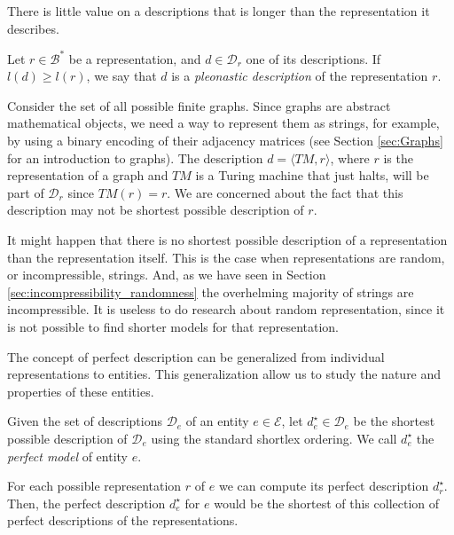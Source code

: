 There is little value on a descriptions that is longer than the representation it describes.

\begin{definition}
\label{def:trivial_model}
Let $r \in \mathcal{B}^\ast$ be a representation, and $d \in \mathcal{D}_r$ one of its descriptions. If $l(d) \geq l(r)$, we say that $d$ is a \emph{pleonastic description} of the representation $r$.
\end{definition}

\begin{example}
\label{ex:topics_models_graph}
Consider the set of all possible finite graphs. Since graphs are abstract mathematical objects, we need a way to represent them as strings, for example, by using a binary encoding of their adjacency matrices (see Section \ref{sec:Graphs} for an introduction to graphs). The description $d = \langle TM, r \rangle$, where $r$ is the representation of a graph and $TM$ is a Turing machine that just halts, will be part of $\mathcal{D}_r$ since $TM(r) = r$. We are concerned about the fact that this description may not be shortest possible description of $r$.
\end{example}

It might happen that there is no shortest possible description of a representation than the representation itself. This is the case when representations are random, or incompressible, strings. And, as we have seen in Section \ref{sec:incompressibility_randomness} the overhelming majority of strings are incompressible. It is useless to do research about random representation, since it is not possible to find shorter models for that representation.

The concept of perfect description can be generalized from individual representations to entities. This generalization allow us to study the nature and properties of these entities.

\begin{definition}
\label{def:entities_perfect_model}
Given the set of descriptions $\mathcal{D}_e$ of an entity $e \in \mathcal{E}$, let $d_e^{\star} \in \mathcal{D}_e$ be the shortest possible description of $\mathcal{D}_e$ using the standard shortlex ordering. We call $d_e^{\star}$ the \emph{perfect model} of entity $e$.
\end{definition}

For each possible representation $r$ of $e$ we can compute its perfect description $d_r^{\star}$. Then, the perfect description $d_e^{\star}$ for $e$ would be the shortest of this collection of perfect descriptions of the representations.

